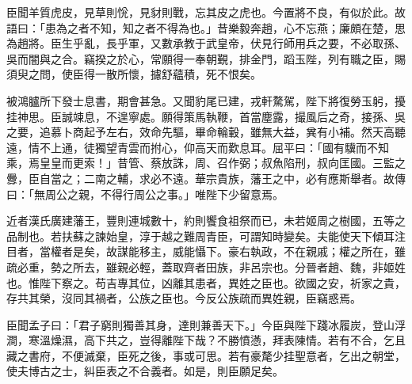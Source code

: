 \begin{pinyinscope}
臣聞羊質虎皮，見草則恱，見豺則戰，忘其皮之虎也。今置將不良，有似於此。故語曰：「患為之者不知，知之者不得為也。」昔樂毅奔趙，心不忘燕；廉頗在楚，思為趙將。臣生乎亂，長乎軍，又數承教于武皇帝，伏見行師用兵之要，不必取孫、吳而闇與之合。竊揆之於心，常願得一奉朝覲，排金門，蹈玉陛，列有職之臣，賜須臾之問，使臣得一散所懷，攄舒蘊積，死不恨矣。


被鴻臚所下發士息書，期會甚急。又聞豹尾已建，戎軒騖駕，陛下將復勞玉躬，擾挂神思。臣誠竦息，不遑寧處。願得策馬執鞭，首當塵露，撮風后之奇，接孫、吳之要，追慕卜商起予左右，效命先驅，畢命輪轂，雖無大益，兾有小補。然天高聽遠，情不上通，徒獨望青雲而拊心，仰高天而歎息耳。屈平曰：「國有驥而不知乘，焉皇皇而更索！」昔管、蔡放誅，周、召作弼；叔魚陷刑，叔向匡國。三監之釁，臣自當之；二南之輔，求必不遠。華宗貴族，藩王之中，必有應斯舉者。故傳曰：「無周公之親，不得行周公之事。」唯陛下少留意焉。


近者漢氏廣建藩王，豐則連城數十，約則饗食祖祭而已，未若姬周之樹國，五等之品制也。若扶蘇之諫始皇，淳于越之難周青臣，可謂知時變矣。夫能使天下傾耳注目者，當權者是矣，故謀能移主，威能懾下。豪右執政，不在親戚；權之所在，雖疏必重，勢之所去，雖親必輕，蓋取齊者田族，非呂宗也。分晉者趙、魏，非姬姓也。惟陛下察之。苟吉專其位，凶離其患者，異姓之臣也。欲國之安，祈家之貴，存共其榮，沒同其禍者，公族之臣也。今反公族疏而異姓親，臣竊惑焉。


臣聞孟子曰：「君子窮則獨善其身，達則兼善天下。」今臣與陛下踐冰履炭，登山浮澗，寒溫燥濕，高下共之，豈得離陛下哉？不勝憤懣，拜表陳情。若有不合，乞且藏之書府，不便滅棄，臣死之後，事或可思。若有豪氂少挂聖意者，乞出之朝堂，使夫博古之士，糾臣表之不合義者。如是，則臣願足矣。



\end{pinyinscope}
